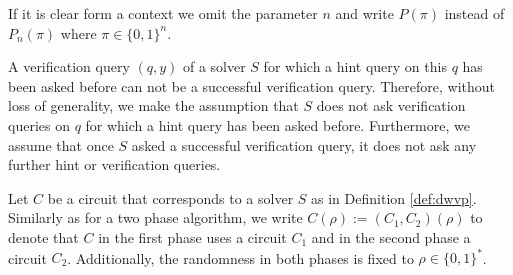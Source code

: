 %
If it is clear form a context we omit the parameter $n$ and write $P(\pi)$ instead of $P_n(\pi)$ where $\pi \in \{0,1\}^{n}$.

A verification query $(q,y)$ of a solver $S$ for which a hint query on this $q$ has been asked before can not be a successful verification query.
Therefore, without loss of generality, we make the assumption that $S$ does not ask verification queries on $q$
for which a hint query has been asked before. Furthermore, we assume that once $S$ asked a successful verification query,
it does not ask any further hint or verification queries.

Let $C$ be a circuit that corresponds to a solver $S$ as in Definition \ref{def:dwvp}.
Similarly as for a two phase algorithm, we write $C(\rho) := (C_1, C_2)(\rho)$ to denote that $C$
in the first phase uses a circuit $C_1$ and in the second phase a circuit $C_2$.
Additionally, the randomness in both phases is fixed to $\rho \in \{0,1\}^{*}$.

